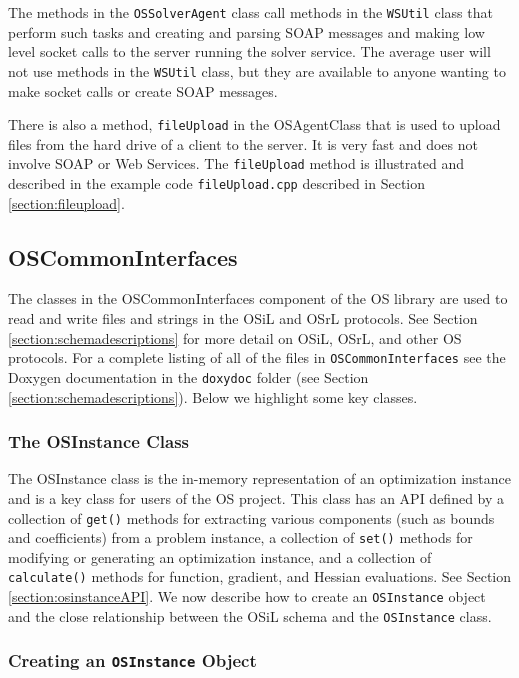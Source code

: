 \documentclass[11pt]{article}
\renewcommand{\_}{{\char"5F}}
\renewcommand{\{}{{\char"7B}}
\renewcommand{\}}{{\char"7D}}
\renewcommand{\^}{{\char"0D}}
\renewcommand{\'}{{\char"0D}}
\begin{document}
The methods in the {\tt OSSolverAgent} class call methods in the {\tt WSUtil} class that perform such tasks and creating and parsing SOAP messages and making low level socket calls to the server running the solver service. The average user will not use methods in the {\tt WSUtil} class, but they are available to anyone wanting to make socket calls or create SOAP messages.

There is also a method, {\tt fileUpload} in the OSAgentClass that is used to upload files from the hard drive of a client to the server. It is very fast and does not involve SOAP or Web Services. The {\tt fileUpload}  method is illustrated and described in the example code {\tt fileUpload.cpp} described in Section \ref{section:fileupload}.

\subsection{OSCommonInterfaces}

The classes in the OSCommonInterfaces component of the OS library are  used  to read and write files and strings in the OSiL and OSrL protocols. See Section \ref{section:schemadescriptions} for more detail on OSiL, OSrL, and other OS protocols. For a complete listing of all of the files in {\tt OSCommonInterfaces} see the Doxygen documentation in the {\tt doxydoc} folder (see Section \ref{section:schemadescriptions}).  Below we highlight some key classes.





\subsubsection{The OSInstance Class}\label{section:osinstanceclass}

The OSInstance class is the in-memory representation of an optimization instance and is a key class for users of the OS project. This class has an API defined by a collection of {\tt get()} methods for extracting various components (such as bounds and coefficients) from a problem instance, a collection of {\tt set()} methods for modifying or generating an optimization instance, and a collection of {\tt calculate()} methods for function, gradient, and Hessian evaluations.  See Section \ref{section:osinstanceAPI}.  We now describe how to create an {\tt OSInstance} object and the close relationship between the OSiL schema and the {\tt OSInstance} class.

\subsubsection{Creating an {\tt OSInstance} Object}
\end{document}
